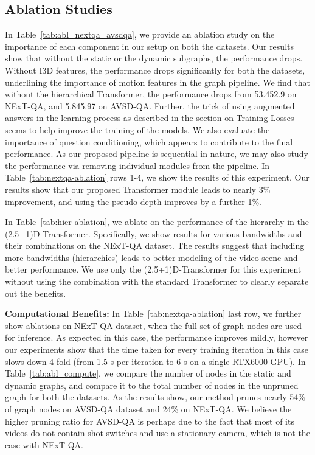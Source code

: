 \documentclass[letterpaper]{article} \usepackage{aaai22}  \usepackage{times}  \usepackage{helvet}  \usepackage{courier}  \usepackage[hyphens]{url}  \usepackage{graphicx} \urlstyle{rm} \def\UrlFont{\rm}  \usepackage{natbib}  \usepackage{caption} \DeclareCaptionStyle{ruled}{labelfont=normalfont,labelsep=colon,strut=off} \frenchspacing  \setlength{\pdfpagewidth}{8.5in}  \setlength{\pdfpageheight}{11in}  \usepackage{algorithm}
\newcommand{\nameTxr}{(2.5+1)D-Transformer\xspace}
\begin{document}
\subsection{Ablation Studies}
In Table~\ref{tab:abl_nextqa_avsdqa}, we provide an ablation study on the importance of each component in our setup on both the datasets. Our results show that without the static or the dynamic subgraphs, the performance drops. Without I3D features, the performance drops significantly for both the datasets, underlining the importance of motion features in the graph pipeline. We find that without the hierarchical Transformer, the performance drops from 53.452.9 on NExT-QA, and 5.845.97 on AVSD-QA. Further, the trick of using augmented answers in the learning process as described in the section on Training Losses seems to help improve the training of the models. We also evaluate the importance of question conditioning, which appears to contribute to the final performance. As our proposed pipeline is sequential in nature, we may also study the performance via removing individual modules from the pipeline. In Table~\ref{tab:nextqa-ablation} rows 1-4, we show the results of this experiment. Our results show that our proposed Transformer module leads to nearly 3\% improvement, and using the pseudo-depth improves by a further 1\%. 

In Table~\ref{tab:hier-ablation}, we ablate on the performance of the hierarchy in the \nameTxr. Specifically, we show results for various bandwidths and their combinations on the NExT-QA dataset. The results suggest that including more bandwidths (hierarchies) leads to better modeling of the video scene and better performance. We use only the \nameTxr for this experiment without using the combination with the standard Transformer to clearly separate out the benefits.

\noindent\textbf{Computational Benefits:} In Table~\ref{tab:nextqa-ablation} last row, we further show ablations on NExT-QA dataset, when the full set of graph nodes are used for inference. As expected in this case, the performance improves mildly, however our experiments show that the time taken for every training iteration in this case slows down 4-fold (from 1.5 s per iteration to 6 s on a single RTX6000 GPU). In Table~\ref{tab:abl_compute}, we compare the number of nodes in the static and dynamic graphs, and compare it to the total number of nodes in the unpruned graph for both the datasets. As the results show, our method prunes nearly 54\% of graph nodes on AVSD-QA dataset and 24\% on NExT-QA. We believe the higher pruning ratio for AVSD-QA is perhaps due to the fact that most of its videos do not contain shot-switches and use a stationary camera, which is not the case with NExT-QA.
\end{document}
